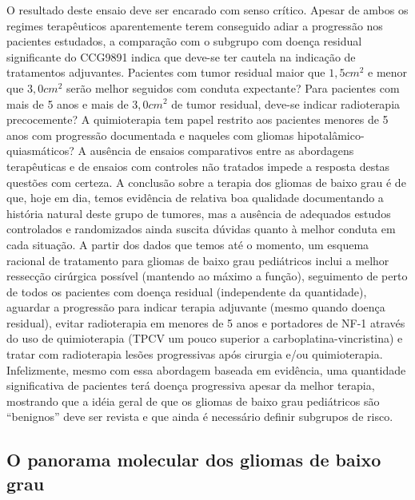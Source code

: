\documentclass[11pt,a4paper,oldfontcommands]{memoir}
\begin{document}
O resultado deste ensaio deve ser encarado com senso crítico. Apesar de ambos os regimes terapêuticos aparentemente terem conseguido adiar a progressão nos pacientes estudados, a comparação com o subgrupo com doença residual significante do CCG9891 indica que deve-se ter cautela na indicação de tratamentos adjuvantes. Pacientes com tumor residual maior que \(1,5 cm^2\) e menor que \(3,0 cm^2\) serão melhor seguidos com conduta expectante? Para pacientes com mais de 5 anos e mais de \(3,0 cm^2\) de tumor residual, deve-se indicar radioterapia precocemente? A quimioterapia tem papel restrito aos pacientes menores de 5 anos com progressão documentada e naqueles com gliomas hipotalâmico-quiasmáticos? A ausência de ensaios comparativos entre as abordagens terapêuticas e de ensaios com controles não tratados impede a resposta destas questões com certeza. A conclusão sobre a terapia dos gliomas de baixo grau é de que, hoje em dia, temos evidência de relativa boa qualidade documentando a história natural deste grupo de tumores, mas a ausência de adequados estudos controlados e randomizados ainda suscita dúvidas quanto à melhor conduta em cada situação. A partir dos dados que temos até o momento, um esquema racional de tratamento para gliomas de baixo grau pediátricos inclui a melhor ressecção cirúrgica possível (mantendo ao máximo a função), seguimento de perto de todos os pacientes com doença residual (independente da quantidade), aguardar a progressão para indicar terapia adjuvante (mesmo quando doença residual), evitar radioterapia em menores de 5 anos e portadores de NF-1 através do uso de quimioterapia (TPCV um pouco superior a carboplatina-vincristina) e tratar com radioterapia lesões progressivas após cirurgia e/ou quimioterapia. Infelizmente, mesmo com essa abordagem baseada em evidência, uma quantidade significativa de pacientes terá doença progressiva apesar da melhor terapia, mostrando que a idéia geral de que os gliomas de baixo grau pediátricos são “benignos” deve ser revista e que ainda é necessário definir subgrupos de risco.

\subsection{O panorama molecular dos gliomas de baixo grau}
\end{document}
